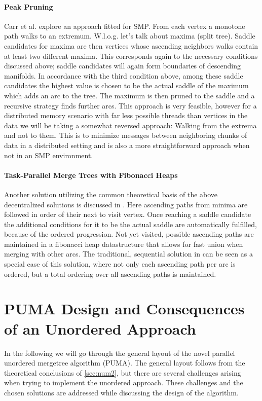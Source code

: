 \documentclass{scrartcl}
\begin{document}
\paragraph{Peak Pruning}
Carr et al. \cite{Carr} explore an approach fitted for SMP. From each vertex a monotone path walks to an extremum. W.l.o.g. let's talk about maxima (split tree). Saddle candidates for maxima are then vertices whose ascending neighbors walks contain at least two different maxima. This corresponds again to the necessary conditions discussed above; saddle candidates will again form boundaries of descending manifolds. In accordance with the third condition above, among these saddle candidates the highest value is chosen to be the actual saddle of the maximum which adds an arc to the tree. The maximum is then pruned to the saddle and a recursive strategy finds further arcs. This approach is very feasible, however for a distributed memory scenario with far less possible threads than vertices in the data we will be taking a somewhat reversed approach: Walking from the extrema and not to them. This is to minimize messages between neighboring chunks of data in a distributed setting and is also a more straightforward approach when not in an SMP environment. 

\paragraph{Task-Parallel Merge Trees with Fibonacci Heaps}
Another solution utilizing the common theoretical basis of the above decentralized solutions is discussed in \cite{FTM}. Here ascending paths from minima are followed in order of their next to visit vertex. Once reaching a saddle candidate the additional conditions for it to be the actual saddle are automatically fulfilled, because of the ordered progression. Not yet visited, possible ascending paths are maintained in a fibonacci heap datastructure that allows for fast union when merging with other arcs. The traditional, sequential solution in \cite{orig} can be seen as a special case of this solution, where not only each ascending path per arc is ordered, but a total ordering over all ascending paths is maintained.

\section{PUMA Design and Consequences of an Unordered Approach}
In the following we will go through the general layout of the novel parallel unordered mergetree algorithm (PUMA). The general layout follows from the theoretical conclusions of \ref{sec:num2}, but there are several challenges arising when trying to implement the unordered approach. These challenges and the chosen solutions are addressed while discussing the design of the algorithm.
\end{document}
